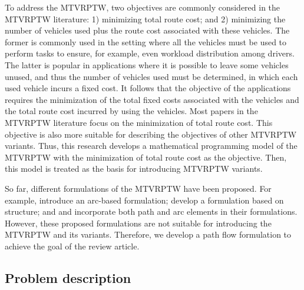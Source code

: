 \documentclass[11pt]{article}
\begin{document}
To address the MTVRPTW, two objectives are commonly considered in the MTVRPTW literature: 1) minimizing total route cost; and 2) minimizing the number of vehicles used plus the route cost associated with these vehicles.  The former is commonly used in the setting where all the vehicles must be used to perform tasks to ensure, for example, even workload distribution among drivers.  The latter is popular in applications where it is possible to leave some vehicles unused, and thus the number of vehicles used must be determined, in which each used vehicle incurs a fixed cost.  It follows that the objective of the applications requires the minimization of the total fixed costs associated with the vehicles and the total route cost incurred by using the vehicles.  Most papers in the MTVRPTW literature focus on the minimization of total route cost.  This objective is also more suitable for describing the objectives of other MTVRPTW variants.  Thus, this research develops a mathematical programming model of the MTVRPTW with the minimization of total route cost as the objective.  Then, this model is treated as the basis for introducing MTVRPTW variants.
\newline

So far, different formulations of the MTVRPTW have been proposed. For example, \cite{hernandez2014new} introduce an arc-based formulation; \cite{paradiso2020exact} develop a formulation based on structure; and \cite{azi2010exact} and \cite{macedo2011solving} incorporate both path and arc elements in their formulations.  However, these proposed formulations are not suitable for introducing the MTVRPTW and its variants.  Therefore, we develop a path flow formulation to achieve the goal of the review article. 


\subsection{Problem description}
\label{sec:math-formulation}
\end{document}

